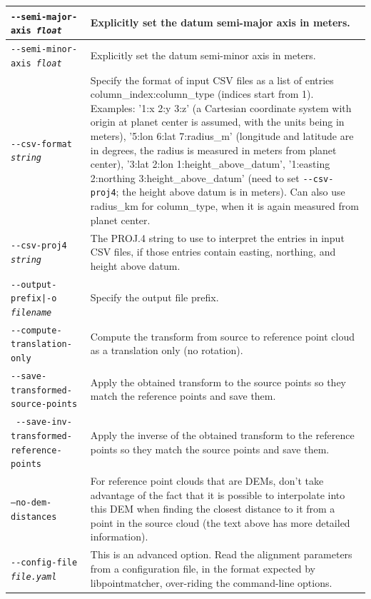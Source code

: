 \begin{longtable}{|p{8cm}|p{9cm}|}
\texttt{-\/-semi-major-axis \textit{float}} & Explicitly set the datum semi-major axis in meters.\\ \hline
\texttt{-\/-semi-minor-axis \textit{float}} & Explicitly set the datum semi-minor axis in meters.\\ \hline

\texttt{-\/-csv-format \textit{string}} & Specify the format of input
CSV files as a list of entries column\_index:column\_type (indices start
from 1). Examples: '1:x 2:y 3:z' (a Cartesian coordinate system with
origin at planet center is assumed, with the units being in meters),
'5:lon 6:lat 7:radius\_m' (longitude and latitude are in degrees, the
radius is measured in meters from planet center), '3:lat 2:lon
1:height\_above\_datum', '1:easting 2:northing 3:height\_above\_datum'
(need to set \texttt{-\/-csv-proj4}; the height above datum is in
meters). Can also use radius\_km for column\_type, when it is again
measured from planet center. \\ \hline

\texttt{-\/-csv-proj4 \textit{string}} & The PROJ.4 string to use to
interpret the entries in input CSV files, if those entries contain
easting, northing, and height above datum. \\ \hline

\texttt{-\/-output-prefix|-o \textit{filename}} & Specify the output file prefix. \\ \hline
\texttt{-\/-compute-translation-only} & Compute the transform from source to reference point cloud as a translation only (no rotation). \\ \hline
\texttt{-\/-save-transformed-source-points} & Apply the obtained transform to the source points so they match the reference points and save them. \\ \hline
\texttt{ -\/-save-inv-transformed-reference-points} & Apply the inverse of the obtained transform to the reference points so they match the source points and save them.
\\ \hline
\texttt{--no-dem-distances} & For reference point clouds that are DEMs, don't take advantage of the fact that it is possible to interpolate into this DEM when finding the closest distance to it from a point in the source cloud (the text above has more detailed information). \\ \hline

\texttt{-\/-config-file \textit{file.yaml}} & This is an advanced
option. Read the alignment parameters from a configuration file, in the
format expected by libpointmatcher, over-riding the command-line options.\\ \hline

\end{longtable}




